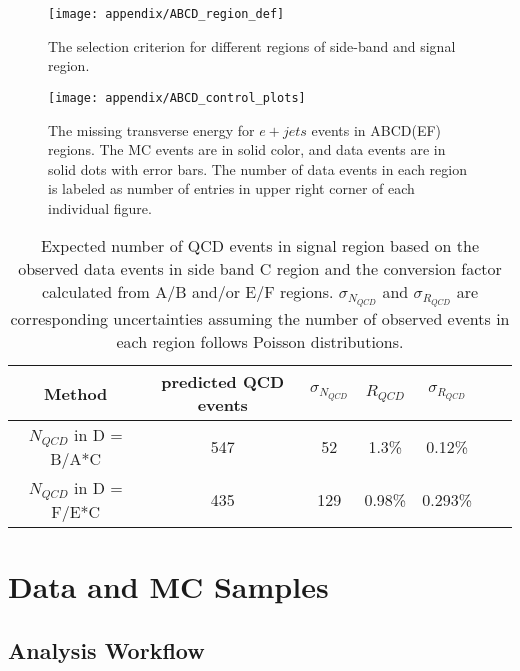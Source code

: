 \begin{figure}[hbt]
	\begin{center}
		\texttt{[image: appendix/ABCD\_region\_def]}
		\caption{\small The selection criterion for different regions of side-band and signal region.}
		\label{fig:ABCD-def}
	\end{center}
\end{figure}

\begin{figure}[hbt]
	\begin{center}
		\texttt{[image: appendix/ABCD\_control\_plots]}
		\caption{\small The missing transverse energy for $e+jets$ events in ABCD(EF) regions. The MC events are in solid color, and data events are in solid dots with error bars. The number of data events in each region is labeled as number of entries in upper right corner of each individual figure. }
		\label{fig:ABCD-MET}
	\end{center}
\end{figure}

\begin{table}[htb]
	\centering
	\begin{tabular}{c|cc|cccc}
		Method & predicted QCD events  &  $\sigma_{N_{QCD}}$ & $R_{QCD}$ & $\sigma_{R_{QCD}}$ \\
		\hline
		$N_{QCD}$ in D = B/A*C      &  547 &   52 &          1.3\% &         0.12\%  \\
		$N_{QCD}$ in D = F/E*C      &  435 &   129 &          0.98\% &         0.293\%  \\
		\hline
	\end{tabular}
	\caption{Expected number of QCD events in signal region based on the observed data events in side band C region and the conversion factor calculated from A/B and/or E/F regions. $\sigma_{N_{QCD}}$ and $\sigma_{R_{QCD}}$ are corresponding uncertainties assuming the number of observed events in each region follows Poisson distributions. }
	\label{tab:ABCD - QCD numbers}
\end{table}


\section{Data and MC Samples}
\label{sec:samples}

\subsection{Analysis Workflow}

